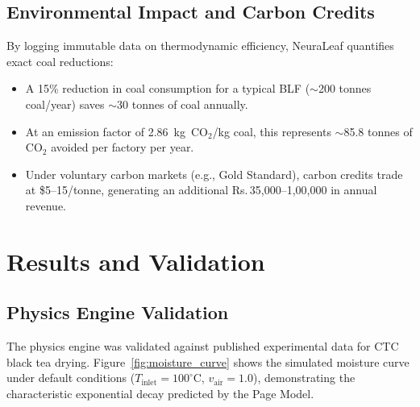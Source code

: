 ﻿\documentclass[12pt, a4paper]{report}
\newcommand{\rupee}{\textrm{Rs.\,}}
\begin{document}
\section{Environmental Impact and Carbon Credits}
By logging immutable data on thermodynamic efficiency, NeuraLeaf quantifies exact coal reductions:
\begin{itemize}
    \item A 15\% reduction in coal consumption for a typical BLF ($\sim$200 tonnes coal/year) saves $\sim$30 tonnes of coal annually.
    \item At an emission factor of 2.86~kg~CO$_2$/kg coal, this represents $\sim$85.8 tonnes of CO$_2$ avoided per factory per year.
    \item Under voluntary carbon markets (e.g., Gold Standard), carbon credits trade at \$5--15/tonne, generating an additional \rupee 35,000--1,00,000 in annual revenue.
\end{itemize}


\chapter{Results and Validation}

\section{Physics Engine Validation}
The physics engine was validated against published experimental data for CTC black tea drying. Figure~\ref{fig:moisture_curve} shows the simulated moisture curve under default conditions ($T_{\text{inlet}} = 100^\circ$C, $v_{\text{air}} = 1.0$), demonstrating the characteristic exponential decay predicted by the Page Model.
\end{document}
